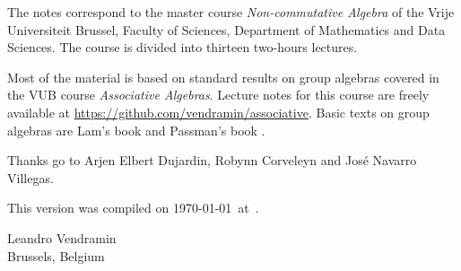 \preface

The notes correspond to the master  
course \emph{Non-commutative Algebra} of the 
Vrije Universiteit Brussel, 
Faculty of Sciences, 
Department of Mathematics and Data Sciences. The course
is divided into thirteen two-hours lectures. 

Most of the material is based on standard 
results on group algebras covered in the VUB course \emph{Associative Algebras}. Lecture  
notes for this course are freely available at 
\url{https://github.com/vendramin/associative}. 
Basic texts on group algebras are Lam's book \cite{MR1125071}
and Passman's book \cite{MR798076}.

 
Thanks go to Arjen Elbert Dujardin, Robynn Corveleyn and
José Navarro Villegas. 

This version 
was compiled on \today~at~\currenttime.

\bigskip
\begin{flushright}
Leandro Vendramin\\Brussels, Belgium\par
\end{flushright}
